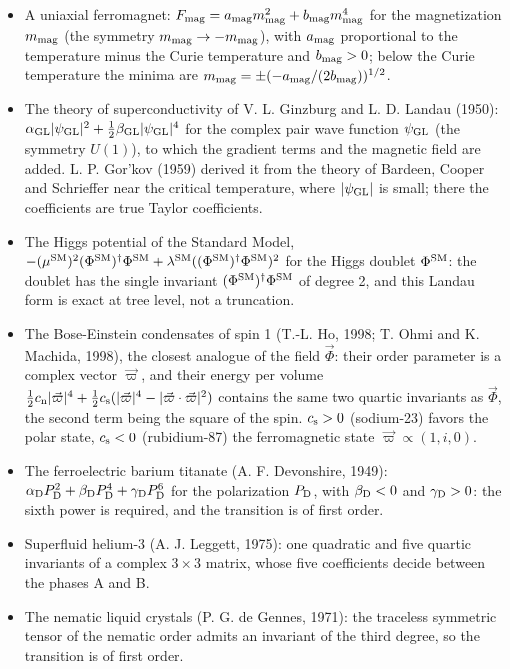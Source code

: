 \documentclass[
  10pt,
]{article}
\providecommand{\tightlist}{%
  \setlength{\itemsep}{0pt}\setlength{\parskip}{0pt}}
\begin{document}
\begin{itemize}
\tightlist
\item
  A uniaxial ferromagnet:
  \(F_{\rm mag}=a_{\rm mag}m_{\rm mag}^2+b_{\rm mag}m_{\rm mag}^4\) for
  the magnetization \(m_{\rm mag}\) (the symmetry
  \(m_{\rm mag}\to-m_{\rm mag}\)), with \(a_{\rm mag}\) proportional to
  the temperature minus the Curie temperature and \(b_{\rm mag}>0\);
  below the Curie temperature the minima are
  \(m_{\rm mag}=\pm(-a_{\rm mag}/(2b_{\rm mag}))^{1/2}\).
\item
  The theory of superconductivity of V. L. Ginzburg and L. D. Landau
  (1950):
  \(\alpha_{\rm GL}\lvert\psi_{\rm GL}\rvert^2+\tfrac12\beta_{\rm GL}\lvert\psi_{\rm GL}\rvert^4\)
  for the complex pair wave function \(\psi_{\rm GL}\) (the symmetry
  \(U(1)\)), to which the gradient terms and the magnetic field are
  added. L. P. Gor'kov (1959) derived it from the theory of Bardeen,
  Cooper and Schrieffer near the critical temperature, where
  \(\lvert\psi_{\rm GL}\rvert\) is small; there the coefficients are
  true Taylor coefficients.
\item
  The Higgs potential of the Standard Model,
  \(-(\mu^{\rm SM})^2(\Phi^{\rm SM})^\dagger\Phi^{\rm SM}+\lambda^{\rm SM}((\Phi^{\rm SM})^\dagger\Phi^{\rm SM})^2\)
  for the Higgs doublet \(\Phi^{\rm SM}\): the doublet has the single
  invariant \((\Phi^{\rm SM})^\dagger\Phi^{\rm SM}\) of degree 2, and
  this Landau form is exact at tree level, not a truncation.
\item
  The Bose-Einstein condensates of spin 1 (T.-L. Ho, 1998; T. Ohmi and
  K. Machida, 1998), the closest analogue of the field \(\vec\Phi\):
  their order parameter is a complex vector \(\vec\varpi\), and their
  energy per volume
  \(\tfrac12c_{\rm n}\lvert\vec\varpi\rvert^4+\tfrac12c_{\rm s}(\lvert\vec\varpi\rvert^4-\lvert\vec\varpi\cdot\vec\varpi\rvert^2)\)
  contains the same two quartic invariants as \(\vec\Phi\), the second
  term being the square of the spin. \(c_{\rm s}>0\) (sodium-23) favors
  the polar state, \(c_{\rm s}<0\) (rubidium-87) the ferromagnetic state
  \(\vec\varpi\propto(1,i,0)\).
\item
  The ferroelectric barium titanate (A. F. Devonshire, 1949):
  \(\alpha_{\rm D}P_{\rm D}^2+\beta_{\rm D}P_{\rm D}^4+\gamma_{\rm D}P_{\rm D}^6\)
  for the polarization \(P_{\rm D}\), with \(\beta_{\rm D}<0\) and
  \(\gamma_{\rm D}>0\): the sixth power is required, and the transition
  is of first order.
\item
  Superfluid helium-3 (A. J. Leggett, 1975): one quadratic and five
  quartic invariants of a complex \(3\times3\) matrix, whose five
  coefficients decide between the phases A and B.
\item
  The nematic liquid crystals (P. G. de Gennes, 1971): the traceless
  symmetric tensor of the nematic order admits an invariant of the third
  degree, so the transition is of first order.
\end{itemize}
\end{document}
